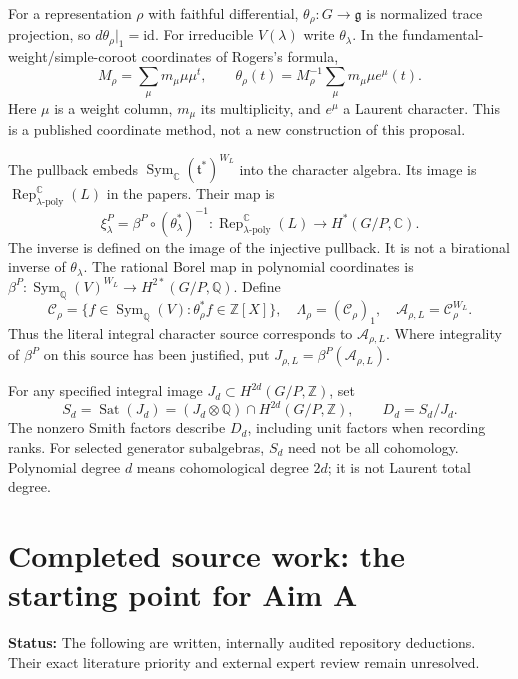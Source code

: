 \documentclass[11pt,letterpaper]{article}
\newcommand{\Z}{\mathbb Z}
\newcommand{\Q}{\mathbb Q}
\newcommand{\C}{\mathbb C}
\newcommand{\Sym}{\operatorname{Sym}}
\newcommand{\Rep}{\operatorname{Rep}}
\newcommand{\Sat}{\operatorname{Sat}}
\newcommand{\status}[1]{\noindent\textbf{Status:} #1\par}
\begin{document}
For a representation \(\rho\) with faithful differential,
\(\theta_\rho:G\to\mathfrak g\) is normalized trace projection,
so \(d\theta_\rho|_1=\mathrm{id}\). For irreducible \(V(\lambda)\)
write \(\theta_\lambda\). In the fundamental-weight/simple-coroot
coordinates of Rogers's formula,
\[
 M_\rho=\sum_\mu m_\mu\mu\mu^t,\qquad
 \theta_\rho(t)=M_\rho^{-1}\sum_\mu m_\mu\mu e^\mu(t).
\]
Here \(\mu\) is a weight column, \(m_\mu\) its multiplicity, and \(e^\mu\)
a Laurent character. This is a published coordinate method, not a new
construction of this proposal.

The pullback embeds \(\Sym_\C(\mathfrak t^*)^{W_L}\) into the character
algebra. Its image is
\(\Rep^\C_{\lambda\text{-}\mathrm{poly}}(L)\) in the papers. Their map is
\[
 \xi_\lambda^P
 =\beta^P\circ(\theta_\lambda^*)^{-1}:
 \Rep^\C_{\lambda\text{-}\mathrm{poly}}(L)
 \longrightarrow H^*(G/P,\C).
\]
The inverse is defined on the image of the injective pullback. It is not
a birational inverse of \(\theta_\lambda\).
The rational Borel map in polynomial coordinates is
\(\beta^P:\Sym_\Q(V)^{W_L}\to H^{2*}(G/P,\Q)\).
Define
\[
 \mathcal C_\rho=
 \{f\in\Sym_\Q(V):\theta_\rho^*f\in\Z[X]\},\quad
 \Lambda_\rho=(\mathcal C_\rho)_1,\quad
 \mathcal A_{\rho,L}=\mathcal C_\rho^{W_L}.
\]
Thus the literal integral character source corresponds to
\(\mathcal A_{\rho,L}\). Where integrality of \(\beta^P\) on this source
has been justified, put \(J_{\rho,L}=\beta^P(\mathcal A_{\rho,L})\).

For any specified integral image \(J_d\subset H^{2d}(G/P,\Z)\), set
\[
 S_d=\Sat(J_d)=(J_d\otimes\Q)\cap H^{2d}(G/P,\Z),\qquad
 D_d=S_d/J_d.
\]
The nonzero Smith factors describe \(D_d\), including unit factors when
recording ranks. For selected generator subalgebras, \(S_d\) need not be
all cohomology. Polynomial degree \(d\) means cohomological degree \(2d\);
it is not Laurent total degree.

\newpage
\section{Completed source work: the starting point for Aim A}
\status{The following are written, internally audited repository deductions.
Their exact literature priority and external expert review remain unresolved.}
\end{document}
